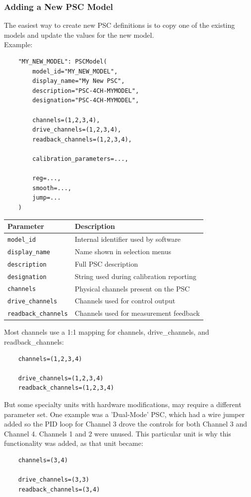 \subsubsection{Adding a New PSC Model}
The easiest way to create new PSC definitions is to copy one of the existing models and update the values for the new model.\\
Example:
\begin{verbatim}
	"MY_NEW_MODEL": PSCModel(
		model_id="MY_NEW_MODEL",
		display_name="My New PSC",
		description="PSC-4CH-MYMODEL",
		designation="PSC-4CH-MYMODEL",
		
		channels=(1,2,3,4),
		drive_channels=(1,2,3,4),
		readback_channels=(1,2,3,4),
		
		calibration_parameters=...,
		
		reg=...,
		smooth=...,
		jump=...
	)
\end{verbatim}
\medskip
{}
\par\medskip
\begin{table}[ht]
	\centering
	\begin{tabular}{lp{10cm}}
		\toprule
		\textbf{Parameter} & \textbf{Description} \\
		\midrule
		\texttt{model\_id}          & Internal identifier used by software \\
		\texttt{display\_name}      & Name shown in selection menus \\
		\texttt{description}        & Full PSC description \\
		\texttt{designation}        & String used during calibration reporting \\
		\texttt{channels}           & Physical channels present on the PSC \\
		\texttt{drive\_channels}    & Channels used for control output \\
		\texttt{readback\_channels} & Channels used for measurement feedback \\
		\bottomrule
	\end{tabular}
	\label{tab:psc-parameters}
\end{table}
\medskip
Most channels use a 1:1 mapping for channels, drive\_channels, and readback\_channels:\\
\begin{verbatim}
	channels=(1,2,3,4)
	
	drive_channels=(1,2,3,4)
	readback_channels=(1,2,3,4)
\end{verbatim}
But some specialty units with hardware modifications, may require a different parameter set. One example was a 'Dual-Mode' PSC, which had a wire jumper added so the PID loop for Channel 3 drove the controls for both Channel 3 and Channel 4. Channels 1 and 2 were unused. This particular unit is why this functionality was added, as that unit became:\\
\begin{verbatim}
	channels=(3,4)
	
	drive_channels=(3,3)
	readback_channels=(3,4)
\end{verbatim}

\newpage


\newpage













